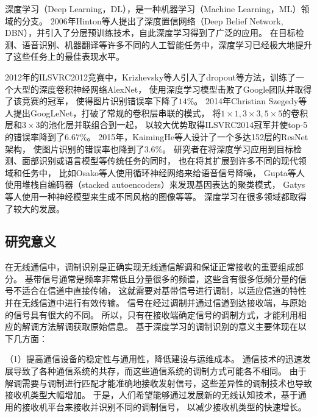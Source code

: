 深度学习（Deep Learning，DL），是一种机器学习（Machine Learning，ML）领域的分支。
2006年Hinton等人提出了深度置信网络（Deep Belief Network, DBN）\cite{hinton2006fast}，并引入了分层预训练技术，自此深度学习得到了广泛的应用。
在目标检测、语音识别、机器翻译等许多不同的人工智能任务中，深度学习已经极大地提升了这些任务上的最佳表现水平\cite{lecun2015deep}。 \par

2012年的ILSVRC2012竞赛中，Krizhevsky等人引入了dropout等方法，训练了一个大型的深度卷积神经网络AlexNet，
使用深度学习模型击败了Google团队并取得了该竞赛的冠军，
使得图片识别错误率下降了$14\%$\cite{krizhevsky2012imagenet}。
2014年Christian Szegedy等人提出GoogLeNet，打破了常规的卷积层串联的模式，
将$1 \times 1, 3 \times 3, 5 \times 5$的卷积层和$3 \times 3$的池化层并联组合到一起，
以较大优势取得ILSVRC2014冠军并使top-5的错误率降到了$6.67\%$\cite{Szegedy_2015_CVPR}。
2015年，KaimingHe等人设计了一个多达152层的ResNet架构，
使图片识别的错误率也降到了$3.6\%$\cite{he2016deep}。
研究者在将深度学习应用到目标检测、面部识别或语言模型等传统任务的同时，
也在将其扩展到许多不同的现代领域和任务中，
比如Osako等人使用循环神经网络来给语音信号降噪\cite{osako2015complex}，
Gupta等人使用堆栈自编码器（stacked autoencoders）来发现基因表达的聚类模式\cite{gupta2015learning}，
Gatys等人使用一种神经模型来生成不同风格的图像\cite{gatys2015neural}等等。
深度学习在很多领域都取得了较大的发展。\par

\subsection{研究意义}

在无线通信中，调制识别是正确实现无线通信解调和保证正常接收的重要组成部分。
基带信号通常是频率非常低且分量很多的频谱，这些含有很多低频分量的信号不适合在信道中直接传输，
这就需要对基带信号进行调制，以适应信道的特性并在无线信道中进行有效传输。
信号在经过调制并通过信道到达接收端，与原始的信号具有很大的不同。
所以，只有在接收端确定信号的调制方式，才能利用相应的解调方法解调获取原始信息。
基于深度学习的调制识别的意义主要体现在以下几方面：\par

（1）提高通信设备的稳定性与通用性，降低建设与运维成本。
通信技术的迅速发展导致了各种通信系统的共存，而这些通信系统的调制方式可能各不相同。
由于解调需要与调制进行匹配才能准确地接收发射信号，这些差异性的调制技术也导致接收机类型大幅增加。
于是，人们希望能够通过发展新的无线认知技术，基于通用的接收机平台来接收并识别不同的调制信号，
以减少接收机类型的快速增长。 \par

